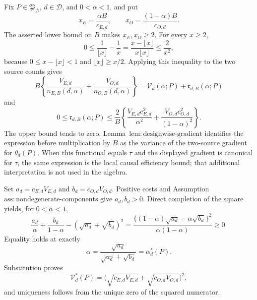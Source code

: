 Fix \(P\in\mathfrak P_{\mathcal D}\), \(d\in\mathcal D\), and \(0<\alpha<1\), and put
\[
x_E=\frac{\alpha B}{c_{E,d}},\qquad
x_O=\frac{(1-\alpha)B}{c_{O,d}}.
\]
The asserted lower bound on \(B\) makes \(x_E,x_O\ge2\). For every \(x\ge2\),
\[
0\le \frac1{\lfloor x\rfloor}-\frac1x
=\frac{x-\lfloor x\rfloor}{x\lfloor x\rfloor}
\le \frac2{x^2},
\]
because \(0\le x-\lfloor x\rfloor<1\) and \(\lfloor x\rfloor\ge x/2\). Applying this inequality to the two source counts gives
\[
B\left\{\frac{V_{E,d}}{n_{E,B}(d,\alpha)}
+\frac{V_{O,d}}{n_{O,B}(d,\alpha)}\right\}
=\mathcal V_d(\alpha;P)+\mathfrak r_{d,B}(\alpha;P)
\]
and
\[
0\le\mathfrak r_{d,B}(\alpha;P)
\le\frac2B\left\{
\frac{V_{E,d}c_{E,d}^2}{\alpha^2}
+\frac{V_{O,d}c_{O,d}^2}{(1-\alpha)^2}\right\}.
\]
The upper bound tends to zero. Lemma~\(\mathrm{lem{:}designwise\text{-}gradient}\) identifies the expression before multiplication by \(B\) as the variance of the two-source gradient for \(\theta_d(P)\). When this functional equals \(\tau\) and the displayed gradient is canonical for \(\tau\), the same expression is the local causal efficiency bound; that additional interpretation is not used in the algebra.

Set \(a_d=c_{E,d}V_{E,d}\) and \(b_d=c_{O,d}V_{O,d}\). Positive costs and Assumption~\(\mathrm{ass{:}nondegenerate\text{-}components}\) give \(a_d,b_d>0\). Direct completion of the square yields, for \(0<\alpha<1\),
\[
\frac{a_d}{\alpha}+\frac{b_d}{1-\alpha}
-(\sqrt{a_d}+\sqrt{b_d})^2
=\frac{\{(1-\alpha)\sqrt{a_d}-\alpha\sqrt{b_d}\}^2}
{\alpha(1-\alpha)}\ge0.
\]
Equality holds at exactly
\[
\alpha=\frac{\sqrt{a_d}}{\sqrt{a_d}+\sqrt{b_d}}
=\alpha_d^*(P).
\]
Substitution proves
\[
\mathcal V_d^*(P)
=\bigl(\sqrt{c_{E,d}V_{E,d}}+\sqrt{c_{O,d}V_{O,d}}\bigr)^2,
\]
and uniqueness follows from the unique zero of the squared numerator.